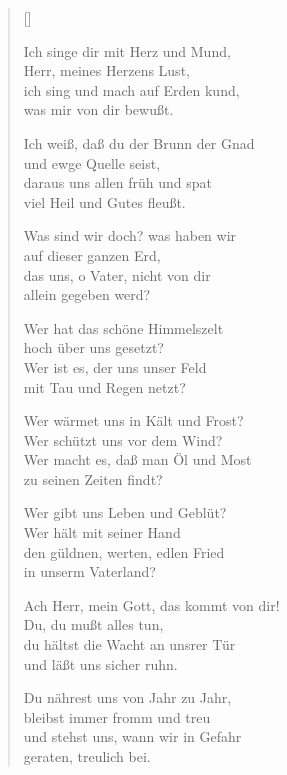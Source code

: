 \begin{multicols}{2}
\settowidth{\versewidth}{Ich weiß, daß du der Brunn der Gnad}
\begin{verse}[\versewidth]

 Ich singe dir mit Herz und Mund,\\
Herr, meines Herzens Lust,\\
ich sing und mach auf Erden kund,\\
was mir von dir bewußt.

 Ich weiß, daß du der Brunn der Gnad\\
und ewge Quelle seist,\\
daraus uns allen früh und spat\\
viel Heil und Gutes fleußt.

 Was sind wir doch? was haben wir\\
auf dieser ganzen Erd,\\
das uns, o Vater, nicht von dir\\
allein gegeben werd?

 Wer hat das schöne Himmelszelt\\
hoch über uns gesetzt?\\
Wer ist es, der uns unser Feld\\
mit Tau und Regen netzt?

 Wer wärmet uns in Kält und Frost?\\
Wer schützt uns vor dem Wind?\\
Wer macht es, daß man Öl und Most\\
zu seinen Zeiten findt?

 Wer gibt uns Leben und Geblüt?\\
Wer hält mit seiner Hand\\
den güldnen, werten, edlen Fried\\
in unserm Vaterland?

 Ach Herr, mein Gott, das kommt von dir!\\
Du, du mußt alles tun,\\
du hältst die Wacht an unsrer Tür\\
und läßt uns sicher ruhn.

 Du nährest uns von Jahr zu Jahr,\\
bleibst immer fromm und treu\\
und stehst uns, wann wir in Gefahr\\
geraten, treulich bei.


\end{verse}
\end{multicols}
